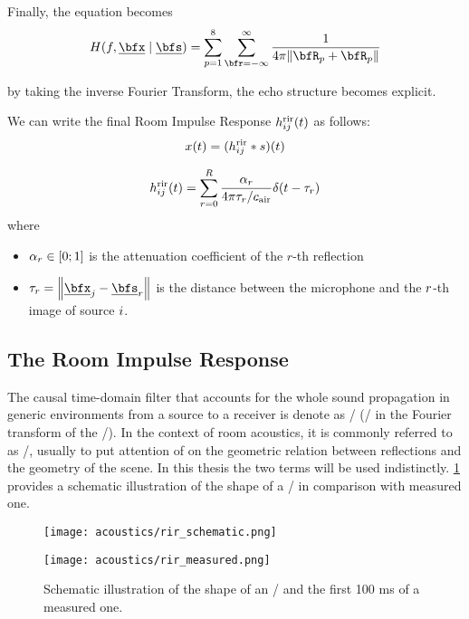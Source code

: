 
Finally, the equation becomes
\begin{equation}
    \label{eq:acoustics:ims:frourier}
    H(f, \positionMicrophone \mid \positionSource) =
        \sum_{p=1}^{8}
            \sum_{\pos=-\infty}^{\infty}
                \frac{1}{4 \pi \norm{\coordinatePermutation_p +  \coordinatePermutation_p}}
\end{equation}

by taking the inverse Fourier Transform, the echo structure becomes explicit.

We can write the final Room Impulse Response $h^{\text{rir}}_{ij}(t)$ as follows:
\begin{equation}
    x(t) = (h^{\text{rir}}_{ij} \ast s)(t)
\end{equation}

\begin{equation}
    \rir_{ij}(t) = \sum_{r=0}^{R} \frac{\alpha_r}{4 \pi \tau_r / \cair} \delta \kparen{t - \tau_r}
\end{equation}
where
\begin{itemize}
    \item $\alpha_r \in \kintervcc{0}{1}$ is the attenuation coefficient of the $r$-th reflection
    \item $\tau_r = \norm{\positionMicrophone_\idxMic - \positionSource_\idxEch}$ is the distance between the microphone and the $r$-th image of source $i$.
\end{itemize}

\subsection{The Room Impulse Response}\label{ch:acoustics:subsec:rir}
The causal time-domain filter that accounts for the whole sound propagation in generic
environments from a source to a receiver is denote as \AIRdef/ (\ATFdef/ in the Fourier transform of the \AIR/).
In the context of room acoustics, it is commonly referred to as \RIRdef/, usually to put attention of
on the geometric relation between reflections and the geometry of the scene.
In this thesis the two terms will be used indistinctly.
\cref{fig:acoustics:rir} provides a schematic illustration of the shape of a \RIR/ in comparison with measured one.

\begin{figure}
    \centering
    \begin{minipage}[b]{.5\textwidth}
        \centering
        \texttt{[image: acoustics/rir\_schematic.png]}
    \end{minipage}%
    \begin{minipage}[b]{.5\textwidth}
        \centering
        \texttt{[image: acoustics/rir\_measured.png]}
    \end{minipage}
    \caption{Schematic illustration of the shape of an \RIR/ and the first 100 ms of a measured one.}
    \label{fig:acoustics:rir}
\end{figure}

